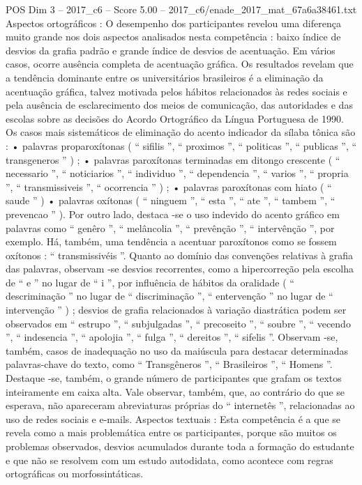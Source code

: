 \begin{textsample}{POS Dim 3 – 2017\_c6 – Score 5.00 – 2017\_c6/enade\_2017\_mat\_67a6a38461.txt}
Aspectos ortográficos : O desempenho dos participantes revelou uma diferença muito grande nos dois aspectos analisados nesta competência : baixo índice de desvios da grafia padrão e grande índice de desvios de acentuação.
Em vários casos, ocorre ausência completa de acentuação gráfica.
Os resultados revelam que a tendência dominante entre os universitários brasileiros é a eliminação da acentuação gráfica, talvez motivada pelos hábitos relacionados às redes sociais e pela ausência de esclarecimento dos meios de comunicação, das autoridades e das escolas sobre as decisões do Acordo Ortográfico da Língua Portuguesa de 1990.
Os casos mais sistemáticos de eliminação do acento indicador da sílaba tônica são : • palavras proparoxítonas ( “ sifilis ”, “ proximos ”, “ politicas ”, “ publicas ”, “ transgeneros ” ) ; • palavras paroxítonas terminadas em ditongo crescente ( “ necessario ”, “ noticiarios ”, “ individuo ”, “ dependencia ”, “ varios ”, “ propria ”, “ transmissiveis ”, “ ocorrencia ” ) ; • palavras paroxítonas com hiato ( “ saude ” ) • palavras oxítonas ( “ ninguem ”, “ esta ”, “ ate ”, “ tambem ”, “ prevencao ” ).
Por outro lado, destaca -se o uso indevido do acento gráfico em palavras como “ genêro ”, “ melâncolia ”, “ prevênção ”, “ intervênção ”, por exemplo.
Há, também, uma tendência a acentuar paroxítonos como se fossem oxítonos : “ transmissivéis ”.
Quanto ao domínio das convenções relativas à grafia das palavras, observam -se desvios recorrentes, como a hipercorreção pela escolha de “ e ” no lugar de “ i ”, por influência de hábitos da oralidade ( “ descriminação ” no lugar de “ discriminação ”, “ entervenção ” no lugar de “ intervenção ” ) ; desvios de grafia relacionados à variação diastrática podem ser observados em “ estrupo ”, “ subjulgadas ”, “ precoseito ”, “ soubre ”, “ vecendo ”, “ indesencia ”, “ apolojia ”, “ fulga ”, “ dereitos ”, “ sifelis ”.
Observam -se, também, casos de inadequação no uso da maiúscula para destacar determinadas palavras-chave do texto, como “ Transgêneros ”, “ Brasileiros ”, “ Homens ”.
Destaque -se, também, o grande número de participantes que grafam os textos inteiramente em caixa alta.
Vale observar, também, que, ao contrário do que se esperava, não apareceram abreviaturas próprias do “ internetês ”, relacionadas ao uso de redes sociais e e-mails.
Aspectos textuais : Esta competência é a que se revela como a mais problemática entre os participantes, porque são muitos os problemas observados, desvios acumulados durante toda a formação do estudante e que não se resolvem com um estudo autodidata, como acontece com regras ortográficas ou morfossintáticas.

\end{textsample}
